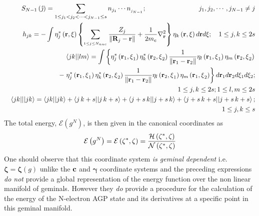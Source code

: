 \documentclass{article}
\begin{document}
\begin{eqnarray}
&&S_{N-1}\left( \hat{\jmath}\right) =\sum_{1\leq j_{1}<j_{2}<\cdots
<j_{N-1}\leq s}n_{j_{1}}\cdots n_{_{j_{N-1}}};\qquad \qquad \qquad \qquad
j_{1},j_{2},\cdots ,j_{N-1}\neq j \\
&&h_{jk}=-\int \eta _{j}^{\ast }\left( \mathbf{r,\xi }\right) \left\{
\sum_{_{1\leq j\leq N_{nuc}}}\frac{Z_{j}}{\left\| \mathbf{R}_{j}-\mathbf{r}%
\right\| }+\frac{1}{2m_{e}}\nabla _{\mathbf{r}}^{2}\right\} \eta _{k}\left( 
\mathbf{r,\xi }\right) d\mathbf{r}d\xi ;\quad 1\leq j,k\leq 2s \\
&&\left\langle jk||lm\right\rangle =\int \left\{ \eta _{j}^{\ast }\left( 
\mathbf{r}_{1}\mathbf{,\xi }_{1}\right) \eta _{k}^{\ast }\left( \mathbf{r}%
_{2}\mathbf{,\xi }_{2}\right) \frac{1}{\left\| \mathbf{r}_{1}-\mathbf{r}%
_{2}\right\| }\eta _{l}\left( \mathbf{r}_{1}\mathbf{,\xi }_{1}\right) \eta
_{m}\left( \mathbf{r}_{2}\mathbf{,\xi }_{2}\right) \right.  \notag \\
&&\qquad -\left. \eta _{j}^{\ast }\left( \mathbf{r}_{1}\mathbf{,\xi }%
_{1}\right) \eta _{k}^{\ast }\left( \mathbf{r}_{2}\mathbf{,\xi }_{2}\right) 
\frac{1}{\left\| \mathbf{r}_{1}-\mathbf{r}_{2}\right\| }\eta _{l}\left( 
\mathbf{r}_{2}\mathbf{,\xi }_{1}\right) \eta _{m}\left( \mathbf{r}_{1}%
\mathbf{,\xi }_{2}\right) \right\} d\mathbf{r}_{1}d\mathbf{r}_{2}d\xi
_{1}d\xi _{2};  \notag \\
&&\left. {}\right. \qquad \qquad \qquad \qquad \qquad \qquad \qquad \qquad
\qquad \qquad \quad 1\leq j,k\leq 2s;1\leq l,m\leq 2s \\
&&\left\langle jk|||jk\right\rangle =\left\langle jk||jk\right\rangle
+\left\langle j\,k+s||j\,k+s\right\rangle +\left\langle
j+s\,k||j+s\,k\right\rangle +\left\langle j+s\,k+s||j+s\,k+s\right\rangle ; 
\notag \\
&&\left. {}\right. \qquad \qquad \qquad \qquad \qquad \qquad \qquad \qquad
\qquad \qquad \qquad \qquad \qquad \quad 1\leq j,k\leq s
\end{eqnarray}%
The total energy, $\mathcal{E}\left( g^{N}\right) $, is then given in the
canonical coordinates as 
\begin{equation}
\mathcal{E}\left( g^{N}\right) =\mathcal{E}\left( \mathbf{\zeta }^{\ast },%
\mathbf{\zeta }\right) =\frac{\mathcal{H}\left( \mathbf{\zeta }^{\ast },%
\mathbf{\zeta }\right) }{\mathcal{N}\left( \mathbf{\zeta }^{\ast },\mathbf{%
\zeta }\right) }
\end{equation}%
One should observe that this coordinate system \emph{is geminal} \emph{%
dependent }i.e. $\mathbf{\zeta =\zeta }\left( g\right) $ unlike the $\mathbf{%
c}$ and $\mathbf{\gamma }$ coordinate systems and the preceding expressions 
\emph{do not} provide a global representation of the energy function over
the non linear manifold of geminals. However they \emph{do }provide a
procedure for the calculation of the energy of the N-electron AGP state and
its derivatives at a specific point in this geminal manifold.
\end{document}
